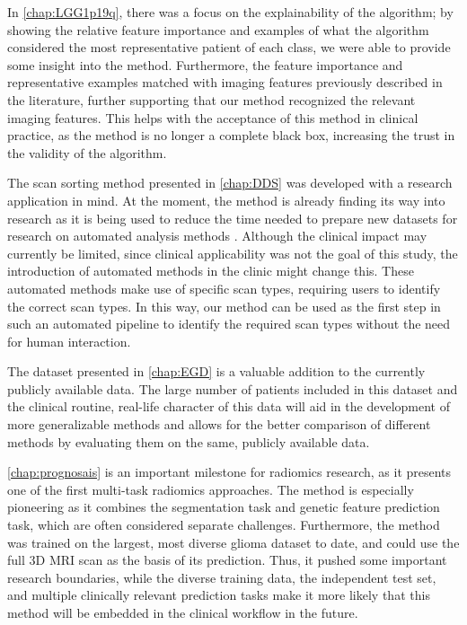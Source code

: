 In \cref{chap:LGG1p19q}, there was a focus on the explainability of the algorithm; by showing the relative feature importance and examples of what the algorithm considered the most representative patient of each class, we were able to provide some insight into the method.
Furthermore, the feature importance and representative examples matched with imaging features previously described in the literature, further supporting that our method recognized the relevant imaging features.
This helps with the acceptance of this method in clinical practice, as the method is no longer a complete black box, increasing the trust in the validity of the algorithm.

The scan sorting method presented in \cref{chap:DDS} was developed with a research application in mind.
At the moment, the method is already finding its way into research as it is being used to reduce the time needed to prepare new datasets for research on automated analysis methods \autocite{garderen2020mgmtdiscussion}.
Although the clinical impact may currently be limited, since clinical applicability was not the goal of this study, the introduction of automated methods in the clinic might change this.
These automated methods make use of specific scan types, requiring users to identify the correct scan types.
In this way, our method can be used as the first step in such an automated pipeline to identify the required scan types without the need for human interaction.

The dataset presented in \cref{chap:EGD} is a valuable addition to the currently publicly available data.
The large number of patients included in this dataset and the clinical routine, real-life character of this data will aid in the development of more generalizable methods and allows for the better comparison of different methods by evaluating them on the same, publicly available data.

\cref{chap:prognosais} is an important milestone for radiomics research, as it presents one of the first multi-task radiomics approaches.
The method is especially pioneering as it combines the segmentation task and genetic feature prediction task, which are often considered separate challenges.
Furthermore, the method was trained on the largest, most diverse glioma dataset to date, and could use the full 3D \gls{MRI} scan as the basis of its prediction.
Thus, it pushed some important research boundaries, while the diverse training data, the independent test set, and multiple clinically relevant prediction tasks make it more likely that this method will be embedded in the clinical workflow in the future.


